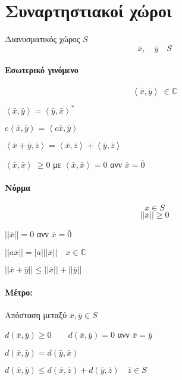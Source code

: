     \section{Συναρτηστιακοί χώροι}
    Διανυσματικός χώρος \( S \)
    \[
    \bar x,\quad \bar y\quad S
    \]

    \paragraph{Εσωτερικό γινόμενο}
    \[ \left\langle\bar x,\bar y\right\rangle\ \in \mathbb C  \]
    \begin{enumpar}
        \item \( \left\langle\bar x,\bar y\right\rangle
        = \left\langle\bar y,\bar x\right\rangle^* \)
        \item \( c\left\langle\bar x,\bar y\right\rangle
        =\left\langle c\bar x,\bar y\right\rangle \)
        \item \( \left\langle\bar x+\bar y,\bar z\right\rangle
        = \left\langle\bar x,\bar z\right\rangle+\left\langle\bar y,\bar z\right\rangle \)
        \item \( \left\langle\bar x,\bar x\right\rangle \ \geq 0 \) με
        \( \left\langle\bar x,\bar x\right\rangle = 0 \) ανν \( \bar x = \bar 0 \)
    \end{enumpar}

    \paragraph{Νόρμα}
    \[
    \bar x \in S
    \]\[
    ||\bar x|| \geq0
    \]
    \begin{enumpar}
        \item \( ||\bar x|| = 0 \) ανν \( \bar x = \bar 0 \)
        \item \( ||a\bar x|| = |a|||\bar x|| \quad x \in\mathbb C \)
        \item \( ||\bar x+\bar y|| \leq ||\bar x|| + ||\bar y|| \)
    \end{enumpar}
    \paragraph{Μέτρο:} Απόσταση μεταξύ \( \bar x,\bar y \in S \)
    \begin{enumpar}
        \item \( d(\bar x,\bar y)\geq 0 \qquad d(\bar x,\bar y)=0 \)
        ανν \( \bar x = \bar y \)
        \item \( d(\bar x,\bar y) = d(\bar y,\bar x) \)
        \item \( d(\bar x,\bar y) \leq d(\bar x,\bar z) + d(\bar y,\bar z)
        \quad \bar z\in S
         \)

    \end{enumpar}
    
